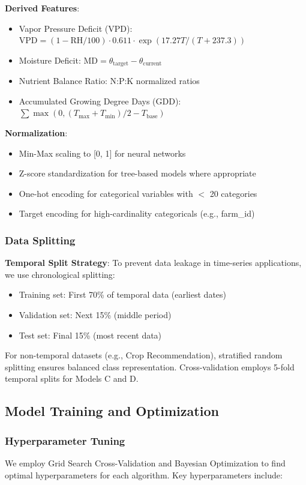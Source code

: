 \documentclass[conference]{IEEEtran}
\begin{document}
\textbf{Derived Features}:
\begin{itemize}
\item Vapor Pressure Deficit (VPD): $\text{VPD} = (1 - \text{RH}/100) \cdot 0.611 \cdot \exp(17.27T/(T+237.3))$
\item Moisture Deficit: $\text{MD} = \theta_{\text{target}} - \theta_{\text{current}}$
\item Nutrient Balance Ratio: N:P:K normalized ratios
\item Accumulated Growing Degree Days (GDD): $\sum \max(0, (T_{\max} + T_{\min})/2 - T_{\text{base}})$
\end{itemize}

\textbf{Normalization}:
\begin{itemize}
\item Min-Max scaling to [0, 1] for neural networks
\item Z-score standardization for tree-based models where appropriate
\item One-hot encoding for categorical variables with $<$ 20 categories
\item Target encoding for high-cardinality categoricals (e.g., farm\_id)
\end{itemize}

\subsubsection{Data Splitting}
\textbf{Temporal Split Strategy}: To prevent data leakage in time-series applications, we use chronological splitting:
\begin{itemize}
\item Training set: First 70\% of temporal data (earliest dates)
\item Validation set: Next 15\% (middle period)
\item Test set: Final 15\% (most recent data)
\end{itemize}

For non-temporal datasets (e.g., Crop Recommendation), stratified random splitting ensures balanced class representation. Cross-validation employs 5-fold temporal splits for Models C and D.

\subsection{Model Training and Optimization}

\subsubsection{Hyperparameter Tuning}
We employ Grid Search Cross-Validation and Bayesian Optimization to find optimal hyperparameters for each algorithm. Key hyperparameters include:
\end{document}
